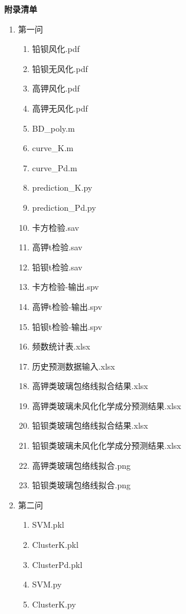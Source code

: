 \documentclass[withoutpreface,bwprint]{cumcmthesis}
\begin{document}
  






\newpage
\begin{appendices}
	\begin{flushleft}
		\textbf{附录清单}
	\end{flushleft}
	\begin{enumerate}
			\item 第一问
			\begin{enumerate}
				\item 铅钡风化.pdf
				\item 铅钡无风化.pdf 
				\item 高钾风化.pdf 
				\item 高钾无风化.pdf
				\item BD\_poly.m
			\item curve\_K.m
			\item curve\_Pd.m
			\item prediction\_K.py
			\item prediction\_Pd.py
			\item 卡方检验.sav
			\item 高钾t检验.sav
			\item 铅钡t检验.sav
			\item 卡方检验-输出.spv
			\item 高钾t检验-输出.spv
			\item 铅钡t检验-输出.spv
			\item 频数统计表.xlsx
			\item 历史预测数据输入.xlsx
			\item 高钾类玻璃包络线拟合结果.xlsx
			\item 高钾类玻璃未风化化学成分预测结果.xlsx
			\item 铅钡类玻璃包络线拟合结果.xlsx
			\item 铅钡类玻璃未风化化学成分预测结果.xlsx
			\item 高钾类玻璃包络线拟合.png
			\item 铅钡类玻璃包络线拟合.png
			\end{enumerate}
			\item 第二问
			\begin{enumerate}
				\item SVM.pkl
				\item ClusterK.pkl
				\item ClusterPd.pkl
				\item SVM.py
				\item ClusterK.py

\end{enumerate}
\end{enumerate}
\end{appendices}
\end{document}
